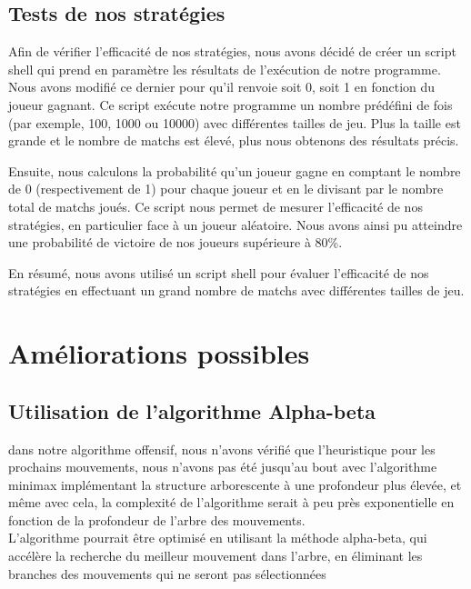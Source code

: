 \documentclass[11pt]{article}
\begin{document}
\subsection{Tests de nos stratégies}

Afin de vérifier l'efficacité de nos stratégies, nous avons décidé de créer un script shell qui prend en paramètre les résultats de l'exécution de notre programme. Nous avons modifié ce dernier pour qu'il renvoie soit 0, soit 1 en fonction du joueur gagnant. Ce script exécute notre programme un nombre prédéfini de fois (par exemple, 100, 1000 ou 10000) avec différentes tailles de jeu. Plus la taille est grande et le nombre de matchs est élevé, plus nous obtenons des résultats précis.

Ensuite, nous calculons la probabilité qu'un joueur gagne en comptant le nombre de 0 (respectivement de 1) pour chaque joueur et en le divisant par le nombre total de matchs joués. Ce script nous permet de mesurer l'efficacité de nos stratégies, en particulier face à un joueur aléatoire. Nous avons ainsi pu atteindre une probabilité de victoire de nos joueurs supérieure à 80\%.



En résumé, nous avons utilisé un script shell pour évaluer l'efficacité de nos stratégies en effectuant un grand nombre de matchs avec différentes tailles de jeu. 
    \section{Améliorations possibles}
        \subsection{Utilisation de l'algorithme Alpha-beta}
dans notre algorithme offensif, nous n'avons vérifié que l'heuristique pour les prochains mouvements, nous n'avons pas été jusqu'au bout avec l'algorithme minimax implémentant la structure arborescente à une profondeur plus élevée, et même avec cela, la complexité de l'algorithme serait à peu près exponentielle en fonction de la profondeur de l'arbre des mouvements.
\\L'algorithme pourrait être optimisé en utilisant la méthode alpha-beta, qui accélère la recherche du meilleur mouvement dans l'arbre, en éliminant les branches des mouvements qui ne seront pas sélectionnées
\end{document}
